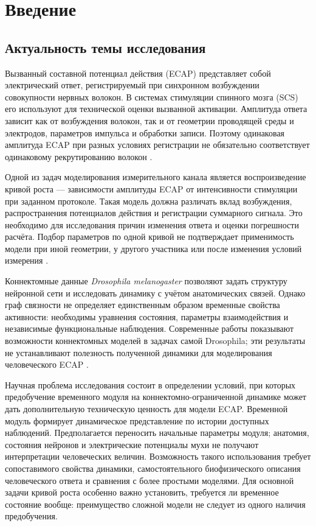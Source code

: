 \chapter*{Введение}
\section*{Актуальность темы исследования}
Вызванный составной потенциал действия (ECAP) представляет собой электрический ответ, регистрируемый при синхронном возбуждении совокупности нервных волокон. В системах стимуляции спинного мозга (SCS) его используют для технической оценки вызванной активации. Амплитуда ответа зависит как от возбуждения волокон, так и от геометрии проводящей среды и электродов, параметров импульса и обработки записи. Поэтому одинаковая амплитуда ECAP при разных условиях регистрации не обязательно соответствует одинаковому рекрутированию волокон \cite{ecapmodel,posture}.

Одной из задач моделирования измерительного канала является воспроизведение кривой роста --- зависимости амплитуды ECAP от интенсивности стимуляции при заданном протоколе. Такая модель должна различать вклад возбуждения, распространения потенциалов действия и регистрации суммарного сигнала. Это необходимо для исследования причин изменения ответа и оценки погрешности расчёта. Подбор параметров по одной кривой не подтверждает применимость модели при иной геометрии, у другого участника или после изменения условий измерения \cite{ecapmodel,posture,s787}.

Коннектомные данные \textit{Drosophila melanogaster} позволяют задать структуру нейронной сети и исследовать динамику с учётом анатомических связей. Однако граф связности не определяет единственным образом временные свойства активности: необходимы уравнения состояния, параметры взаимодействия и независимые функциональные наблюдения. Современные работы показывают возможности коннектомных моделей в задачах самой Drosophila; эти результаты не устанавливают полезность полученной динамики для моделирования человеческого ECAP \cite{s743,s744,s775}.

Научная проблема исследования состоит в определении условий, при которых предобучение временного модуля на коннектомно-ограниченной динамике может дать дополнительную техническую ценность для модели ECAP. Временной модуль формирует динамическое представление по истории доступных наблюдений. Предполагается переносить начальные параметры модуля; анатомия, состояния нейронов и электрические потенциалы мухи не получают интерпретации человеческих величин. Возможность такого использования требует сопоставимого свойства динамики, самостоятельного биофизического описания человеческого ответа и сравнения с более простыми моделями. Для основной задачи кривой роста особенно важно установить, требуется ли временное состояние вообще: преимущество сложной модели не следует из одного наличия предобучения.

